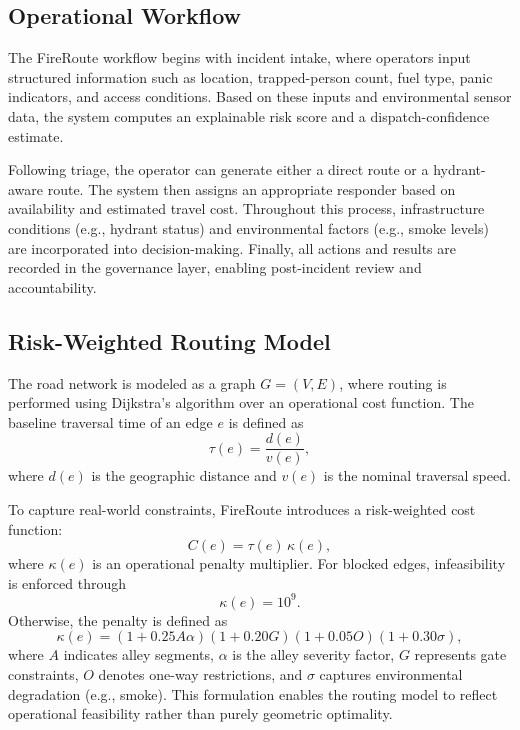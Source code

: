 \subsection{Operational Workflow}

The FireRoute workflow begins with incident intake, where operators input structured information such as location, trapped-person count, fuel type, panic indicators, and access conditions. Based on these inputs and environmental sensor data, the system computes an explainable risk score and a dispatch-confidence estimate.

Following triage, the operator can generate either a direct route or a hydrant-aware route. The system then assigns an appropriate responder based on availability and estimated travel cost. Throughout this process, infrastructure conditions (e.g., hydrant status) and environmental factors (e.g., smoke levels) are incorporated into decision-making. Finally, all actions and results are recorded in the governance layer, enabling post-incident review and accountability.

\subsection{Risk-Weighted Routing Model}

The road network is modeled as a graph $G=(V,E)$, where routing is performed using Dijkstra’s algorithm over an operational cost function. The baseline traversal time of an edge $e$ is defined as
\begin{equation}
\tau(e) = \frac{d(e)}{v(e)},
\end{equation}
where $d(e)$ is the geographic distance and $v(e)$ is the nominal traversal speed.

To capture real-world constraints, FireRoute introduces a risk-weighted cost function:
\begin{equation}
C(e) = \tau(e)\,\kappa(e),
\end{equation}
where $\kappa(e)$ is an operational penalty multiplier. For blocked edges, infeasibility is enforced through
\begin{equation}
\kappa(e) = 10^9.
\end{equation}
Otherwise, the penalty is defined as
\begin{equation}
\kappa(e) = (1 + 0.25A\alpha)(1 + 0.20G)(1 + 0.05O)(1 + 0.30\sigma),
\end{equation}
where $A$ indicates alley segments, $\alpha$ is the alley severity factor, $G$ represents gate constraints, $O$ denotes one-way restrictions, and $\sigma$ captures environmental degradation (e.g., smoke). This formulation enables the routing model to reflect operational feasibility rather than purely geometric optimality.

